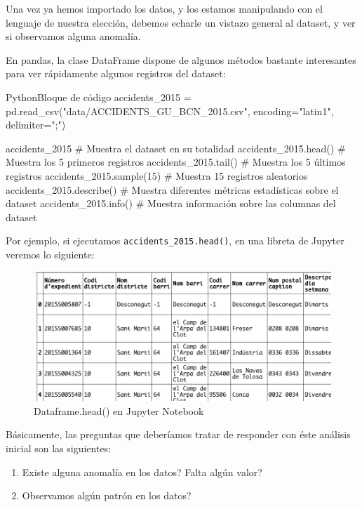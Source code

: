 Una vez ya hemos importado los datos, y los estamos manipulando con el lenguaje
de nuestra elección, debemos echarle un vistazo general al dataset, y ver si
observamos alguna anomalía.

En pandas, la clase DataFrame dispone de algunos métodos bastante interesantes
para ver rápidamente algunos registros del dataset: 

\vspace{0.5cm}

\begin{TMcode}{Python}{}{Bloque de código}
accidents_2015 = pd.read_csv("data/ACCIDENTS_GU_BCN_2015.csv", encoding="latin1", delimiter=";")

accidents_2015            # Muestra el dataset en su totalidad
accidents_2015.head()     # Muestra los 5 primeros registros
accidents_2015.tail()     # Muestra los 5 últimos registros
accidents_2015.sample(15) # Muestra 15 registros aleatorios
accidents_2015.describe() # Muestra diferentes métricas estadísticas sobre el dataset
accidents_2015.info()     # Muestra información sobre las columnas del dataset
\end{TMcode}

Por ejemplo, si ejecutamos \texttt{accidents\_2015.head()}, en una libreta de
Jupyter veremos lo siguiente:

\begin{figure}[ht!]
  \hspace{-0.7cm}
  \includegraphics[scale = 0.45]{img/dataframeHead.png}
  \caption{\label{fig:dataframeHead} Dataframe.head() en Jupyter Notebook}
\end{figure}

Básicamente, las preguntas que deberíamos tratar de responder con éste análisis
inicial son las siguientes:

\begin{enumerate}
\item Existe alguna anomalía en los datos? Falta algún valor?
\item Observamos algún patrón en los datos?
\end{enumerate}


